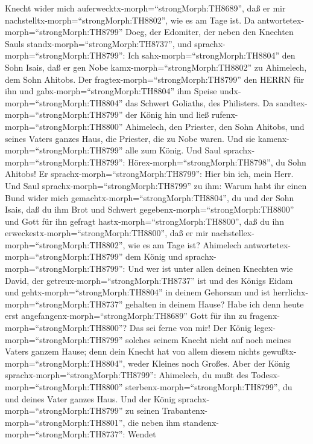 Knecht wider mich auferwecktx-morph=``strongMorph:TH8689'', daß er mir
nachstelltx-morph=``strongMorph:TH8802'', wie es am Tage ist.
 Da antwortetex-morph=``strongMorph:TH8799'' Doeg, der
Edomiter, der neben den Knechten Sauls
standx-morph=``strongMorph:TH8737'', und
sprachx-morph=``strongMorph:TH8799'': Ich
sahx-morph=``strongMorph:TH8804'' den Sohn Isais, daß er gen Nobe
kamx-morph=``strongMorph:TH8802'' zu Ahimelech, dem Sohn Ahitobs.
 Der fragtex-morph=``strongMorph:TH8799'' den HERRN für ihn
und gabx-morph=``strongMorph:TH8804'' ihm Speise
undx-morph=``strongMorph:TH8804'' das Schwert Goliaths, des Philisters.
 Da sandtex-morph=``strongMorph:TH8799'' der König hin und
ließ rufenx-morph=``strongMorph:TH8800'' Ahimelech, den Priester, den
Sohn Ahitobs, und seines Vaters ganzes Haus, die Priester, die zu Nobe
waren. Und sie kamenx-morph=``strongMorph:TH8799'' alle zum König.
 Und Saul sprachx-morph=``strongMorph:TH8799'':
Hörex-morph=``strongMorph:TH8798'', du Sohn Ahitobs! Er
sprachx-morph=``strongMorph:TH8799'': Hier bin ich, mein Herr.
 Und Saul sprachx-morph=``strongMorph:TH8799'' zu ihm:
Warum habt ihr einen Bund wider mich
gemachtx-morph=``strongMorph:TH8804'', du und der Sohn Isais, daß du ihm
Brot und Schwert gegebenx-morph=``strongMorph:TH8800'' und Gott für ihn
gefragt hastx-morph=``strongMorph:TH8800'', daß du ihn
erweckestx-morph=``strongMorph:TH8800'', daß er mir
nachstellex-morph=``strongMorph:TH8802'', wie es am Tage ist?
 Ahimelech antwortetex-morph=``strongMorph:TH8799'' dem
König und sprachx-morph=``strongMorph:TH8799'': Und wer ist unter allen
deinen Knechten wie David, der getreux-morph=``strongMorph:TH8737'' ist
und des Königs Eidam und gehtx-morph=``strongMorph:TH8804'' in deinem
Gehorsam und ist herrlichx-morph=``strongMorph:TH8737'' gehalten in
deinem Hause?  Habe ich denn heute erst
angefangenx-morph=``strongMorph:TH8689'' Gott für ihn zu
fragenx-morph=``strongMorph:TH8800''? Das sei ferne von mir! Der König
legex-morph=``strongMorph:TH8799'' solches seinem Knecht nicht auf noch
meines Vaters ganzem Hause; denn dein Knecht hat von allem diesem nichts
gewußtx-morph=``strongMorph:TH8804'', weder Kleines noch Großes.
 Aber der König sprachx-morph=``strongMorph:TH8799'':
Ahimelech, du mußt des Todesx-morph=``strongMorph:TH8800''
sterbenx-morph=``strongMorph:TH8799'', du und deines Vater ganzes Haus.
 Und der König sprachx-morph=``strongMorph:TH8799'' zu
seinen Trabantenx-morph=``strongMorph:TH8801'', die neben ihm
standenx-morph=``strongMorph:TH8737'': Wendet
